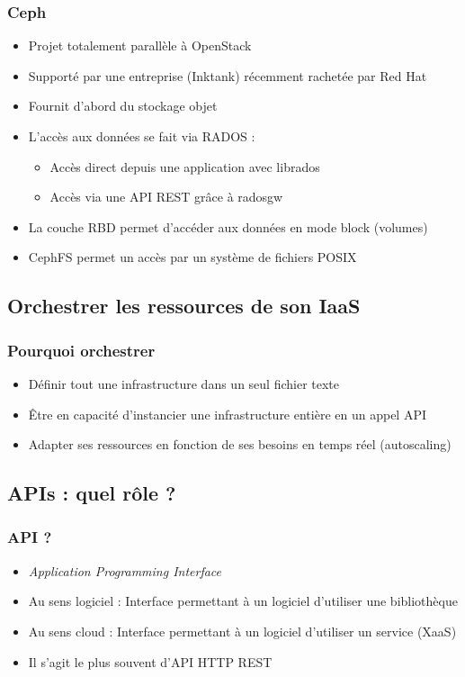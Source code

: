   \begin{frame}
  \frametitle{Ceph}
    \begin{itemize}
      \item Projet totalement parallèle à OpenStack
      \item Supporté par une entreprise (Inktank) récemment rachetée par Red Hat
      \item Fournit d'abord du stockage objet
      \item L'accès aux données se fait via RADOS :
      \begin{itemize}
        \item Accès direct depuis une application avec librados
        \item Accès via une API REST grâce à radosgw
      \end{itemize}
      \item La couche RBD permet d'accéder aux données en mode block (volumes)
      \item CephFS permet un accès par un système de fichiers POSIX
    \end{itemize}
  \end{frame}

  \subsection[Orchestration]{Orchestrer les ressources de son IaaS}

  \begin{frame}
    \frametitle{Pourquoi orchestrer}
    \begin{itemize}
      \item Définir tout une infrastructure dans un seul fichier texte
      \item Être en capacité d'instancier une infrastructure entière en un appel API
      \item Adapter ses ressources en fonction de ses besoins en temps réel (autoscaling)
    \end{itemize}
  \end{frame}

  \subsection[APIs]{APIs : quel rôle ?}

  \begin{frame}
    \frametitle{API ?}
    \begin{itemize}
      \item \textit{Application Programming Interface}
      \item Au sens logiciel : Interface permettant à un logiciel d'utiliser une bibliothèque
      \item Au sens cloud : Interface permettant à un logiciel d'utiliser un service (XaaS)
      \item Il s'agit le plus souvent d'API HTTP REST
    \end{itemize}
  \end{frame}

